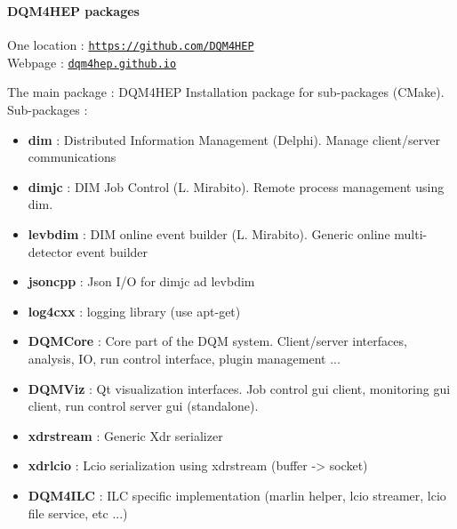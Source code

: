 \documentclass[8pt]{beamer}
\begin{document}
  \begin{frame}
    \frametitle{\secname}
    \framesubtitle{DQM4HEP packages}
    One location : \href{https://github.com/DQM4HEP}{\tt https://github.com/DQM4HEP} \\
    Webpage : \href{dqm4hep.github.io}{\tt dqm4hep.github.io} \\
    \begin{block}{The main package : DQM4HEP}
      Installation package for sub-packages (CMake). \\
      Sub-packages :
      \begin{itemize}
        \item \textbf{dim} : Distributed Information Management (Delphi). Manage client/server communications
        \item \textbf{dimjc} : DIM Job Control (L. Mirabito). Remote process management using dim.
        \item \textbf{levbdim} : DIM online event builder (L. Mirabito). Generic online multi-detector event builder
        \item \textbf{jsoncpp} : Json I/O for dimjc ad levbdim
        \item \textbf{log4cxx} : logging library (use apt-get)
        \item \textbf{DQMCore} : Core part of the DQM system. Client/server interfaces, analysis, IO, run control interface, plugin management ...
        \item \textbf{DQMViz} : Qt visualization interfaces. Job control gui client, monitoring gui client, run control server gui (standalone).
        \item \textbf{xdrstream} : Generic Xdr serializer
        \item \textbf{xdrlcio} : Lcio serialization using xdrstream (buffer -> socket)
        \item \textbf{DQM4ILC} : ILC specific implementation (marlin helper, lcio streamer, lcio file service, etc ...)
      \end{itemize}
    \end{block}
  \end{frame}
\end{document}
